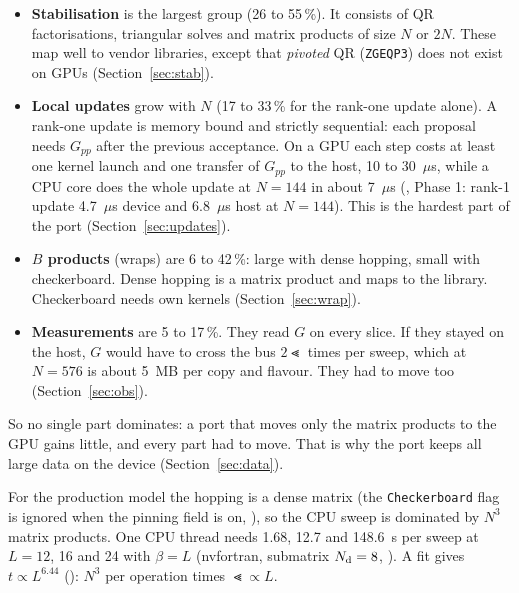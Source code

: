 \begin{itemize}
\item \textbf{Stabilisation} is the largest group (26 to 55\,\%). It consists of QR factorisations, triangular solves and matrix products of size $N$ or $2N$. These map well to vendor libraries, except that \emph{pivoted} QR (\texttt{ZGEQP3}) does not exist on GPUs (Section~\ref{sec:stab}).
\item \textbf{Local updates} grow with $N$ (17 to 33\,\% for the rank-one update alone). A rank-one update is memory bound and strictly sequential: each proposal needs $G_{pp}$ after the previous acceptance. On a GPU each step costs at least one kernel launch and one transfer of $G_{pp}$ to the host, 10 to 30~$\mu$s, while a CPU core does the whole update at $N=144$ in about 7~$\mu$s (, Phase 1: rank-1 update 4.7~$\mu$s device and 6.8~$\mu$s host at $N=144$). %
This is the hardest part of the port (Section~\ref{sec:updates}).
\item \textbf{$B$ products} (wraps) are 6 to 42\,\%: large with dense hopping, small with checkerboard. Dense hopping is a matrix product and maps to the library. Checkerboard needs own kernels (Section~\ref{sec:wrap}).
\item \textbf{Measurements} are 5 to 17\,\%. They read $G$ on every slice. If they stayed on the host, $G$ would have to cross the bus $2\Lt$ times per sweep, which at $N=576$ is about 5~MB per copy and flavour. They had to move too (Section~\ref{sec:obs}).
\end{itemize}

So no single part dominates: a port that moves only the matrix products to the GPU gains little, and every part had to move. That is why the port keeps all large data on the device (Section~\ref{sec:data}).

For the production model the hopping is a dense matrix (the \texttt{Checkerboard} flag is ignored when the pinning field is on, ), so the CPU sweep is dominated by $N^3$ matrix products. One CPU thread needs 1.68, 12.7 and 148.6~s per sweep at $L=12$, 16 and 24 with $\beta=L$ (nvfortran, submatrix $N_{\rm d}=8$, ). %
A fit gives $t\propto L^{6.44}$ (): $N^3$ per operation times $\Lt\propto L$. %
